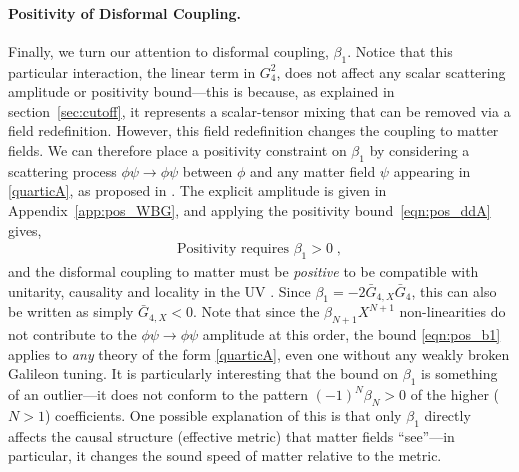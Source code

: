 \documentclass[11pt]{article}
\begin{document}
\paragraph{Positivity of Disformal Coupling.}
Finally, we turn our attention to disformal coupling, $\beta_1$. Notice that this particular interaction, the linear term in $G_4^2$, does not affect any scalar scattering amplitude or positivity bound---this is because, as explained in section~\ref{sec:cutoff}, it represents a scalar-tensor mixing that can be removed via a field redefinition. However, this field redefinition changes the coupling to matter fields.
We can therefore place a positivity constraint on $\beta_1$ by considering a scattering process $\phi \psi \to \phi \psi$ between $\phi$ and any matter field $\psi$ appearing in \eqref{quarticA}, as proposed in \cite{deRham:2021fpu}. The explicit amplitude is given in Appendix~\ref{app:pos_WBG}, and applying the positivity bound~\eqref{eqn:pos_ddA} gives,
\begin{align}
\text{Positivity requires } \beta_1 > 0 \; ,
\label{eqn:pos_b1}
\end{align}
and the disformal coupling to matter must be \emph{positive} to be compatible with unitarity, causality and locality in the UV \cite{deRham:2021fpu}. 
Since $\beta_1 = - 2 \bar{G}_{4,X} \bar{G}_4$, this can also be written as simply $\bar{G}_{4,X} < 0$.
Note that since the $\beta_{N+1} X^{N+1}$ non-linearities do not contribute to the $\phi \psi \to \phi \psi$ amplitude at this order, the bound \eqref{eqn:pos_b1} applies to \emph{any} theory of the form \eqref{quarticA}, even one without any weakly broken Galileon tuning. 
It is particularly interesting that the bound on $\beta_1$ is something of an outlier---it does not conform to the pattern $(-1)^N \beta_N > 0$ of the higher ($N>1$) coefficients. 
One possible explanation of this is that only $\beta_1$ directly affects the causal structure (effective metric) that matter fields ``see''---in particular, it changes the sound speed of matter relative to the metric. 


\end{document}
